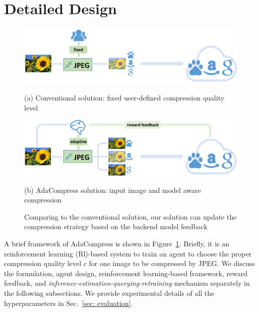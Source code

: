 \section{Detailed Design}
\label{sec: design}

\begin{figure}
    \begin{minipage}{\linewidth}
        \centerline{\includegraphics[width=0.8\linewidth]{figures/conventional-framework.pdf}}
        \begin{center}
            {(a) Conventional solution: fixed user-defined compression quality level}
        \end{center}
    \end{minipage}
    \vfill
    \vspace{0.4cm}
    \begin{minipage}{\linewidth}
        \centerline{\includegraphics[width=0.8\linewidth]{figures/adaptive-framework.pdf}}
        \vspace{0.2cm}
        \begin{center}
            {(b) AdaCompress solution: input image and model aware compression}
        \end{center}
    \end{minipage}
    \vspace{0.1cm}
    \caption{Comparing to the conventional solution, our solution can update the compression strategy based on the backend model feedback}
    \label{fig: framework}
\end{figure}

A brief framework of AdaCompress is shown in Figure~\ref{fig: framework}. Briefly, it is an reinforcement learning (Rl)-based system to train an agent to choose the proper compression quality level $ c $ for one image to be compressed by JPEG. We discuss the formulation, agent design, reinforcement learning-based framework, reward feedback, and \emph{inference-estimation-querying-retraining} mechanism separately in the following subsections. We provide experimental details of all the hyperparameters in Sec.~\ref{sec: evaluation}. %

